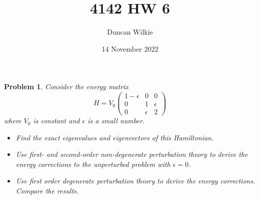 \documentclass{article}
\title{4142 HW 6}
\author{Duncan Wilkie}
\date{14 November 2022}
\newtheorem{plm}{Problem}
\begin{document}
\maketitle

\begin{plm}
  Consider the energy matrix
  \[
    H = V_{0}
    \begin{pmatrix}
      1 - \epsilon & 0 & 0 \\
      0 & 1 & \epsilon \\
      0 & \epsilon & 2
    \end{pmatrix}
  \]
  where $V_{0}$ is constant and $\epsilon$ is a small number.
  \begin{itemize}
  \item Find the exact eigenvalues and eigenvectors of this Hamiltonian.
  \item Use first- and second-order non-degenerate perturbation theory to derive the energy corrections to the unperturbed problem with
    $\epsilon = 0$.
  \item Use first order degenerate perturbation theory to derive the energy corrections.
    Compare the results.
  \end{itemize}
\end{plm}
\end{document}
